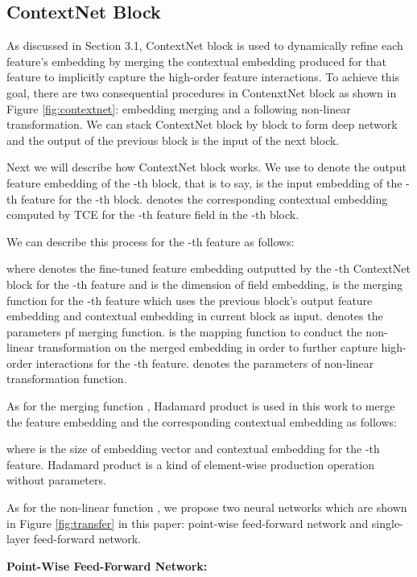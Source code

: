 \documentclass[sigconf]{acmart}
\begin{document}
\subsection{ContextNet Block}
As discussed in Section 3.1,  ContextNet block is used to dynamically refine each feature's embedding by merging the contextual embedding produced for that feature to implicitly capture the high-order feature interactions. To achieve this goal, there are two consequential procedures in  ContenxtNet block as shown in Figure \ref{fig:contextnet}: embedding merging and a following non-linear transformation. We can stack ContextNet block by block to form deep network and the output of the previous block is the input of the next block.


Next we will describe how ContextNet block works. We use   to denote the output feature embedding of the -th block, that is to say,  is the input embedding of the -th feature for the -th block.  denotes the corresponding contextual embedding computed by TCE for the -th feature field in the -th block.


We can describe this process for the -th feature as follows:

where  denotes the fine-tuned feature embedding outputted by the -th ContextNet block for the -th feature  and  is the dimension of field embedding,  is the merging function for the -th feature which uses the previous block's output feature embedding  and contextual embedding  in current block as input.  denotes the parameters pf merging function.  is the mapping function to conduct the non-linear transformation on the merged embedding in order to further capture high-order interactions for the -th feature.  denotes the parameters of non-linear transformation function.


As for the merging function , Hadamard product is used  in this work to merge the feature embedding  and the corresponding contextual embedding  as follows:



\noindent where  is the size of embedding vector  and contextual embedding  for the -th feature. Hadamard product is a kind of element-wise production operation without parameters.



As for the non-linear function , we propose two neural networks which are shown in Figure \ref{fig:transfer} in this paper: point-wise feed-forward network and single-layer feed-forward network.


\noindent\textbf{Point-Wise Feed-Forward Network: }
\end{document}
